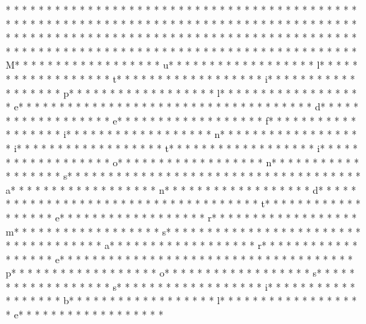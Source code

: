 * * *  * * *  * * *  *  * * *  *  * * *  * 
* * *  * * *  * * *  *  * * *  *  * * *  * * *  * * *  *  * * *  *  * * *  * * *  * * *  *  * * *  *  * * *  *  * * *  * * *  * * *  *  * * *  *  * * *  *  * * *  * * *  * * *  *  * * *  *  * * *  *  * * *  * * *  * * *  *  * * *  *  * * *  *  * * *  * * *  * * *  *  * * *  *  * * *  *  * * *  * * *  * * *  *  * * *  *  * * *  *  * * *  * * *  * * *  *  * * *  *  * * *  * M* * *  * * *  * * *  *  * * *  *  * * *  * u* * *  * * *  * * *  *  * * *  *  * * *  * l* * *  * * *  * * *  *  * * *  *  * * *  * t* * *  * * *  * * *  *  * * *  *  * * *  * i* * *  * * *  * * *  *  * * *  *  * * *  * p* * *  * * *  * * *  *  * * *  *  * * *  * l* * *  * * *  * * *  *  * * *  *  * * *  * e* * *  * * *  * * *  *  * * *  *  * * *  *  * * *  * * *  * * *  *  * * *  *  * * *  * d* * *  * * *  * * *  *  * * *  *  * * *  * e* * *  * * *  * * *  *  * * *  *  * * *  * f* * *  * * *  * * *  *  * * *  *  * * *  * i* * *  * * *  * * *  *  * * *  *  * * *  * n* * *  * * *  * * *  *  * * *  *  * * *  * i* * *  * * *  * * *  *  * * *  *  * * *  * t* * *  * * *  * * *  *  * * *  *  * * *  * i* * *  * * *  * * *  *  * * *  *  * * *  * o* * *  * * *  * * *  *  * * *  *  * * *  * n* * *  * * *  * * *  *  * * *  *  * * *  * s* * *  * * *  * * *  *  * * *  *  * * *  *  * * *  * * *  * * *  *  * * *  *  * * *  * a* * *  * * *  * * *  *  * * *  *  * * *  * n* * *  * * *  * * *  *  * * *  *  * * *  * d* * *  * * *  * * *  *  * * *  *  * * *  *  * * *  * * *  * * *  *  * * *  *  * * *  * t* * *  * * *  * * *  *  * * *  *  * * *  * e* * *  * * *  * * *  *  * * *  *  * * *  * r* * *  * * *  * * *  *  * * *  *  * * *  * m* * *  * * *  * * *  *  * * *  *  * * *  * s* * *  * * *  * * *  *  * * *  *  * * *  *  * * *  * * *  * * *  *  * * *  *  * * *  * a* * *  * * *  * * *  *  * * *  *  * * *  * r* * *  * * *  * * *  *  * * *  *  * * *  * e* * *  * * *  * * *  *  * * *  *  * * *  *  * * *  * * *  * * *  *  * * *  *  * * *  * p* * *  * * *  * * *  *  * * *  *  * * *  * o* * *  * * *  * * *  *  * * *  *  * * *  * s* * *  * * *  * * *  *  * * *  *  * * *  * s* * *  * * *  * * *  *  * * *  *  * * *  * i* * *  * * *  * * *  *  * * *  *  * * *  * b* * *  * * *  * * *  *  * * *  *  * * *  * l* * *  * * *  * * *  *  * * *  *  * * *  * e* * *  * * *  * * *  *  * * *  *  * * *  * 

